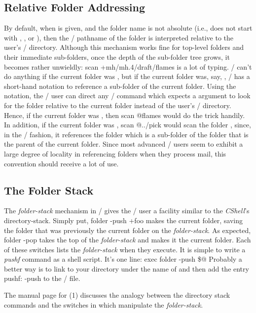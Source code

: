 \subsection{Relative Folder Addressing}
By default, when  is given,
and the folder name is not absolute
(i.e., does not start with \file{/}, , or ),
then the \unix/ pathname of the folder is interpreted relative to the user's
\MH/ directory.
Although this mechanism works fine for top-level folders and their immediate
sub-folders,
once the depth of the sub-folder tree grows, it becomes rather unwieldly:
\example scan +mh/mh.4/draft/flames\endexample
is a lot of typing.
\MH/ can't do anything if the current folder was ,
but if the current folder was, say, ,
\MH/ has a short-hand notation to reference a sub-folder of the
current folder.
Using the  notation,
the \MH/ user can direct any \MH/ command which expects a 
argument to look for the folder relative to the current folder instead of the
user's \MH/ directory.
Hence, if the current folder was ,
then
\example scan @flames\endexample
would do the trick handily.
In addition, if the current folder was ,
\example scan @../pick\endexample
would scan the folder ,
since, in the \unix/ fashion,
it references the folder  which is a sub-folder of
the folder that is the parent of the current folder.
Since most advanced \MH/ users seem to exhibit a large degree of locality
in referencing folders when they process mail,
this convention should receive a lot of use.
\subsection{The Folder Stack}
The {\it folder-stack\/} mechanism in \MH/ gives the \MH/ user a
facility similar to the {\it CShell\/}'s directory-stack.
Simply put,
\example folder -push +foo\endexample
makes  the current folder,
saving the folder that was previously the current folder on the
{\it folder-stack}.
As expected,
\example folder -pop\endexample
takes the top of the {\it folder-stack\/} and makes it the current folder.
Each of these switches lists the {\it folder-stack\/} when they execute.
It is simple to write a {\it pushf\/} command as a shell script.
It's one line:
\example exec folder -push \$@\endexample
Probably a better way is to link  to your 
directory under the name of  and then add the entry
\example pushf: -push\endexample
to the \profile/ file.
\par
The manual page for (1) discusses the analogy between the
 directory stack commands and the switches in 
which manipulate the {\it folder-stack}.

